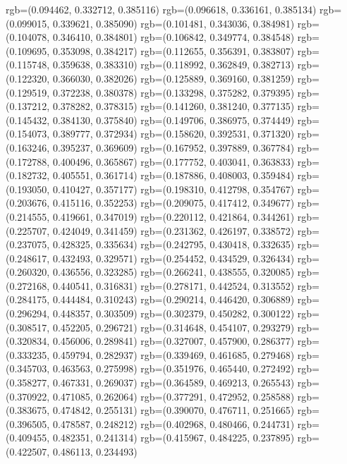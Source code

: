 {{{					rgb=(0.094462, 0.332712, 0.385116)
					rgb=(0.096618, 0.336161, 0.385134)
					rgb=(0.099015, 0.339621, 0.385090)
					rgb=(0.101481, 0.343036, 0.384981)
					rgb=(0.104078, 0.346410, 0.384801)
					rgb=(0.106842, 0.349774, 0.384548)
					rgb=(0.109695, 0.353098, 0.384217)
					rgb=(0.112655, 0.356391, 0.383807)
					rgb=(0.115748, 0.359638, 0.383310)
					rgb=(0.118992, 0.362849, 0.382713)
					rgb=(0.122320, 0.366030, 0.382026)
					rgb=(0.125889, 0.369160, 0.381259)
					rgb=(0.129519, 0.372238, 0.380378)
					rgb=(0.133298, 0.375282, 0.379395)
					rgb=(0.137212, 0.378282, 0.378315)
					rgb=(0.141260, 0.381240, 0.377135)
					rgb=(0.145432, 0.384130, 0.375840)
					rgb=(0.149706, 0.386975, 0.374449)
					rgb=(0.154073, 0.389777, 0.372934)
					rgb=(0.158620, 0.392531, 0.371320)
					rgb=(0.163246, 0.395237, 0.369609)
					rgb=(0.167952, 0.397889, 0.367784)
					rgb=(0.172788, 0.400496, 0.365867)
					rgb=(0.177752, 0.403041, 0.363833)
					rgb=(0.182732, 0.405551, 0.361714)
					rgb=(0.187886, 0.408003, 0.359484)
					rgb=(0.193050, 0.410427, 0.357177)
					rgb=(0.198310, 0.412798, 0.354767)
					rgb=(0.203676, 0.415116, 0.352253)
					rgb=(0.209075, 0.417412, 0.349677)
					rgb=(0.214555, 0.419661, 0.347019)
					rgb=(0.220112, 0.421864, 0.344261)
					rgb=(0.225707, 0.424049, 0.341459)
					rgb=(0.231362, 0.426197, 0.338572)
					rgb=(0.237075, 0.428325, 0.335634)
					rgb=(0.242795, 0.430418, 0.332635)
					rgb=(0.248617, 0.432493, 0.329571)
					rgb=(0.254452, 0.434529, 0.326434)
					rgb=(0.260320, 0.436556, 0.323285)
					rgb=(0.266241, 0.438555, 0.320085)
					rgb=(0.272168, 0.440541, 0.316831)
					rgb=(0.278171, 0.442524, 0.313552)
					rgb=(0.284175, 0.444484, 0.310243)
					rgb=(0.290214, 0.446420, 0.306889)
					rgb=(0.296294, 0.448357, 0.303509)
					rgb=(0.302379, 0.450282, 0.300122)
					rgb=(0.308517, 0.452205, 0.296721)
					rgb=(0.314648, 0.454107, 0.293279)
					rgb=(0.320834, 0.456006, 0.289841)
					rgb=(0.327007, 0.457900, 0.286377)
					rgb=(0.333235, 0.459794, 0.282937)
					rgb=(0.339469, 0.461685, 0.279468)
					rgb=(0.345703, 0.463563, 0.275998)
					rgb=(0.351976, 0.465440, 0.272492)
					rgb=(0.358277, 0.467331, 0.269037)
					rgb=(0.364589, 0.469213, 0.265543)
					rgb=(0.370922, 0.471085, 0.262064)
					rgb=(0.377291, 0.472952, 0.258588)
					rgb=(0.383675, 0.474842, 0.255131)
					rgb=(0.390070, 0.476711, 0.251665)
					rgb=(0.396505, 0.478587, 0.248212)
					rgb=(0.402968, 0.480466, 0.244731)
					rgb=(0.409455, 0.482351, 0.241314)
					rgb=(0.415967, 0.484225, 0.237895)
					rgb=(0.422507, 0.486113, 0.234493)
}}}
